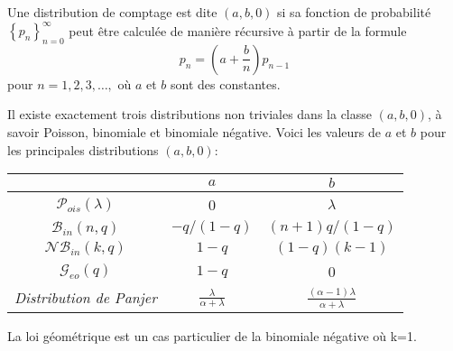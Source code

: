 \begin{f}
	
	Une distribution de comptage est dite  $(a, b, 0)$ si sa fonction de probabilité $\left\{p_{n}\right\}_{n=0}^{\infty}$ peut être calculée de manière récursive à partir de la formule
	$$
	p_{n}=\left(a+\frac{b}{n}\right) p_{n-1}
	$$
	pour $n=1,2,3, \ldots,$ où $a$ et $b$ sont des constantes.
	
	Il existe exactement trois distributions non triviales dans la classe $(a, b, 0)$, à savoir Poisson, binomiale et binomiale négative. Voici les valeurs de $a$ et $b$ pour les principales distributions $(a, b, 0)$:
	\begin{center}
		\begin{tabular}{ccc} 
			& $a$ & $b$ \\
			\hline$\mathcal{P}_{ois}(\lambda)$ & 0 & $\lambda$ \\
			$\mathcal{B}_{in}(n, q)$ & $-q /(1-q)$ & $(n+1) q /(1-q)$ \\
			$\mathcal{N}\mathcal{B}_{in}(k, q)$ & $1-q$ & $(1-q)(k-1)$ \\
			$\mathcal{G}_{eo}( q)$ & $1-q$ & 0 \\
			\textit{    Distribution de Panjer} & $\frac{\lambda}{\alpha+\lambda}$ &    $\frac {(\alpha -1)\lambda }{\alpha +\lambda }$ \\
			\hline 
		\end{tabular}
		
	\end{center}
	
	{\small\color{OrangeProfondIRA} La loi géométrique est un cas particulier de la binomiale négative où k=1.}
\end{f}

